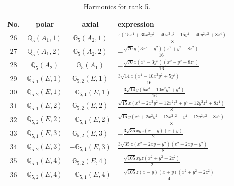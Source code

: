 \documentclass[fleqn,8pt,landscape]{jsarticle}
\begin{document}
\begin{table}[ht!]
\begin{center}
\caption{Harmonics for rank 5.}
\renewcommand{\arraystretch}{1.3}
\begin{tabular}{cccl} \hline \hline
No. & polar & axial & expression \\ \hline
$ 26 $ & $ \mathbb{Q}_{5}(A_{1},1) $ & $ \mathbb{G}_{5}(A_{2},1) $ & $ \frac{z \left(15 x^{4} + 30 x^{2} y^{2} - 40 x^{2} z^{2} + 15 y^{4} - 40 y^{2} z^{2} + 8 z^{4}\right)}{8} $ \\
$ 27 $ & $ \mathbb{Q}_{5}(A_{1},2) $ & $ \mathbb{G}_{5}(A_{2},2) $ & $ - \frac{\sqrt{70} y \left(3 x^{2} - y^{2}\right) \left(x^{2} + y^{2} - 8 z^{2}\right)}{16} $ \\
$ 28 $ & $ \mathbb{Q}_{5}(A_{2}) $ & $ \mathbb{G}_{5}(A_{1}) $ & $ - \frac{\sqrt{70} x \left(x^{2} - 3 y^{2}\right) \left(x^{2} + y^{2} - 8 z^{2}\right)}{16} $ \\
$ 29 $ & $ \mathbb{Q}_{5,1}(E,1) $ & $ \mathbb{G}_{5,2}(E,1) $ & $ \frac{3 \sqrt{14} x \left(x^{4} - 10 x^{2} y^{2} + 5 y^{4}\right)}{16} $ \\
$ 30 $ & $ \mathbb{Q}_{5,2}(E,1) $ & $ -\mathbb{G}_{5,1}(E,1) $ & $ - \frac{3 \sqrt{14} y \left(5 x^{4} - 10 x^{2} y^{2} + y^{4}\right)}{16} $ \\
$ 31 $ & $ \mathbb{Q}_{5,1}(E,2) $ & $ \mathbb{G}_{5,2}(E,2) $ & $ \frac{\sqrt{15} x \left(x^{4} + 2 x^{2} y^{2} - 12 x^{2} z^{2} + y^{4} - 12 y^{2} z^{2} + 8 z^{4}\right)}{8} $ \\
$ 32 $ & $ \mathbb{Q}_{5,2}(E,2) $ & $ -\mathbb{G}_{5,1}(E,2) $ & $ \frac{\sqrt{15} y \left(x^{4} + 2 x^{2} y^{2} - 12 x^{2} z^{2} + y^{4} - 12 y^{2} z^{2} + 8 z^{4}\right)}{8} $ \\
$ 33 $ & $ \mathbb{Q}_{5,1}(E,3) $ & $ \mathbb{G}_{5,2}(E,3) $ & $ - \frac{3 \sqrt{35} x y z \left(x - y\right) \left(x + y\right)}{2} $ \\
$ 34 $ & $ \mathbb{Q}_{5,2}(E,3) $ & $ -\mathbb{G}_{5,1}(E,3) $ & $ \frac{3 \sqrt{35} z \left(x^{2} - 2 x y - y^{2}\right) \left(x^{2} + 2 x y - y^{2}\right)}{8} $ \\
$ 35 $ & $ \mathbb{Q}_{5,1}(E,4) $ & $ \mathbb{G}_{5,2}(E,4) $ & $ - \frac{\sqrt{105} x y z \left(x^{2} + y^{2} - 2 z^{2}\right)}{2} $ \\
$ 36 $ & $ \mathbb{Q}_{5,2}(E,4) $ & $ -\mathbb{G}_{5,1}(E,4) $ & $ - \frac{\sqrt{105} z \left(x - y\right) \left(x + y\right) \left(x^{2} + y^{2} - 2 z^{2}\right)}{4} $ \\
 \hline \hline
\end{tabular}
\end{center}
\end{table}
\end{document}
